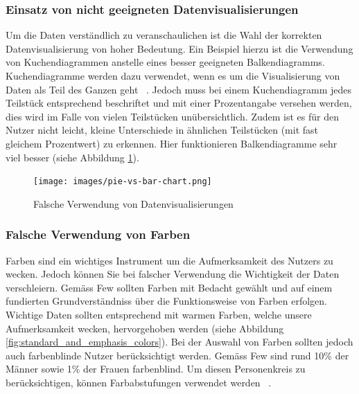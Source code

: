 \subsubsection{Einsatz von nicht geeigneten Datenvisualisierungen}
Um die Daten verständlich zu veranschaulichen ist die Wahl der korrekten Datenvisualisierung von hoher Bedeutung. Ein Beispiel hierzu ist die Verwendung von Kuchendiagrammen anstelle eines besser geeigneten Balkendiagramms. Kuchendiagramme werden dazu verwendet, wenn es um die Visualisierung von Daten als Teil des Ganzen geht ~\citep[S. 59]{information_dashboard_design}. Jedoch muss bei einem Kuchendiagramm jedes Teilstück entsprechend beschriftet und mit einer Prozentangabe versehen werden, dies wird im Falle von vielen Teilstücken unübersichtlich. Zudem ist es für den Nutzer nicht leicht, kleine Unterschiede in ähnlichen Teilstücken (mit fast gleichem Prozentwert) zu erkennen. Hier funktionieren Balkendiagramme sehr viel besser (siehe Abbildung \ref{fig:pie_vs_bar_chart}).

\begin{figure}[h]
    \texttt{[image: images/pie-vs-bar-chart.png]}
    \centering
    \caption{Falsche Verwendung von Datenvisualisierungen ~\citep{pie_vs_bar_chart}}
    \label{fig:pie_vs_bar_chart}
\end{figure}


\subsubsection{Falsche Verwendung von Farben} \label{ch:introduction_colors}
Farben sind ein wichtiges Instrument um die Aufmerksamkeit des Nutzers zu wecken. Jedoch können Sie bei falscher Verwendung die Wichtigkeit der Daten verschleiern. Gemäss Few sollten Farben mit Bedacht gewählt und auf einem fundierten Grundverständniss über die Funktionsweise von Farben erfolgen. Wichtige Daten sollten entsprechend mit warmen Farben, welche unsere Aufmerksamkeit wecken, hervorgehoben werden (siehe Abbildung \ref{fig:standard_and_emphasis_colors}). Bei der Auswahl von Farben sollten jedoch auch farbenblinde Nutzer berücksichtigt werden. Gemäss Few sind rund 10\% der Männer sowie 1\% der Frauen farbenblind. Um diesen Personenkreis zu berücksichtigen, können Farbabstufungen verwendet werden ~\citep[S. 75 + 154]{information_dashboard_design}.

